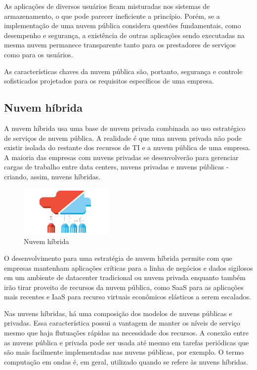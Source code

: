 As aplicações de diversos usuários ficam misturadas nos sistemas de armazenamento,
o que pode parecer ineficiente a princípio. Porém, se a implementação de uma nuvem
pública considera questões fundamentais, como desempenho e segurança, a existência
de outras aplicações sendo executadas na mesma nuvem permanece transparente tanto
para os prestadores de serviços como para os usuários.

As características chaves da nuvem pública são, portanto, segurança e controle
sofisticados projetados para os requisitos específicos de uma empresa.

\subsection{Nuvem híbrida}

A nuvem híbrida usa uma base de nuvem privada combinada ao uso estratégico de
serviços de nuvem pública. A realidade é que uma nuvem privada não pode existir
isolada do restante dos recursos de TI e a nuvem pública de uma empresa. A maioria
das empresas com nuvens privadas se desenvolverão para gerenciar cargas de trabalho
entre data centers, nuvens privadas e nuvens públicas - criando, assim, nuvens
híbridas.

\begin{figure}[ht]
    \centering
    \includegraphics[width=0.4\textwidth]{img/hybrid.png}
    \caption{Nuvem híbrida}
    \label{img:hybridcloud}
\end{figure}

O desenvolvimento para uma estratégia de nuvem híbrida permite com que empresas
mantenham aplicações críticas para a linha de negócios e dados sigilosos em um
ambiente de datacenter tradicional ou nuvem privada enquanto também irão tirar
proveito de recursos da nuvem pública, como SaaS para as aplicações mais
recentes e IaaS para recurso virtuais econômicos elásticos a serem escalados.

Nas nuvens híbridas, há uma composição dos modelos de nuvens públicas e privadas.
Essa característica possui a vantagem de manter os níveis de serviço mesmo que
haja flutuações rápidas na necessidade dos recursos. A conexão entre as nuvens
pública e privada pode ser usada até mesmo em tarefas periódicas que são mais
facilmente implementadas nas nuvens públicas, por exemplo. O termo computação
em ondas é, em geral, utilizado quando se refere às nuvens híbridas.

